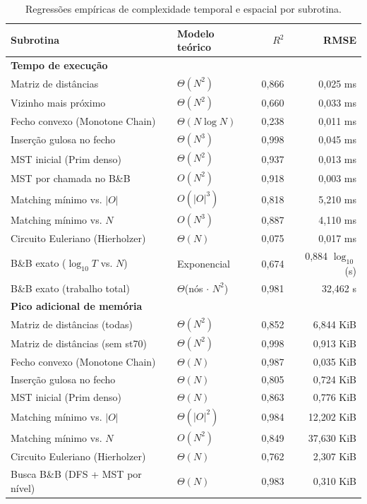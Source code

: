 \documentclass[12pt]{article}
\begin{document}
\begin{table}[ht]
\centering
\footnotesize
\caption{Regressões empíricas de complexidade temporal e espacial por subrotina.}
\label{tab:regressoes}
\begin{tabular}{llrr}
\hline
Subrotina & Modelo teórico & $R^2$ & RMSE \\
\hline
\multicolumn{4}{l}{\textbf{Tempo de execução}} \\
Matriz de distâncias & $\Theta(N^2)$ & 0,866 & 0,025 ms \\
Vizinho mais próximo & $\Theta(N^2)$ & 0,660 & 0,033 ms \\
Fecho convexo (Monotone Chain) & $\Theta(N \log N)$ & 0,238 & 0,011 ms \\
Inserção gulosa no fecho & $\Theta(N^3)$ & 0,998 & 0,045 ms \\
MST inicial (Prim denso) & $\Theta(N^2)$ & 0,937 & 0,013 ms \\
MST por chamada no B\&B & $O(N^2)$ & 0,918 & 0,003 ms \\
Matching mínimo vs. $|O|$ & $O(|O|^3)$ & 0,818 & 5,210 ms \\
Matching mínimo vs. $N$ & $O(N^3)$ & 0,887 & 4,110 ms \\
Circuito Euleriano (Hierholzer) & $\Theta(N)$ & 0,075 & 0,017 ms \\
B\&B exato ($\log_{10} T$ vs. $N$) & Exponencial & 0,674 & 0,884 $\log_{10}$(s) \\
B\&B exato (trabalho total) & $\Theta$(nós $\cdot$ $N^2$) & 0,981 & 32,462 s \\
\hline
\multicolumn{4}{l}{\textbf{Pico adicional de memória}} \\
Matriz de distâncias (todas) & $\Theta(N^2)$ & 0,852 & 6,844 KiB \\
Matriz de distâncias (sem st70) & $\Theta(N^2)$ & 0,998 & 0,913 KiB \\
Fecho convexo (Monotone Chain) & $\Theta(N)$ & 0,987 & 0,035 KiB \\
Inserção gulosa no fecho & $\Theta(N)$ & 0,805 & 0,724 KiB \\
MST inicial (Prim denso) & $\Theta(N)$ & 0,863 & 0,776 KiB \\
Matching mínimo vs. $|O|$ & $\Theta(|O|^2)$ & 0,984 & 12,202 KiB \\
Matching mínimo vs. $N$ & $O(N^2)$ & 0,849 & 37,630 KiB \\
Circuito Euleriano (Hierholzer) & $\Theta(N)$ & 0,762 & 2,307 KiB \\
Busca B\&B (DFS + MST por nível) & $\Theta(N)$ & 0,983 & 0,310 KiB \\
\hline
\end{tabular}
\end{table}
\end{document}
